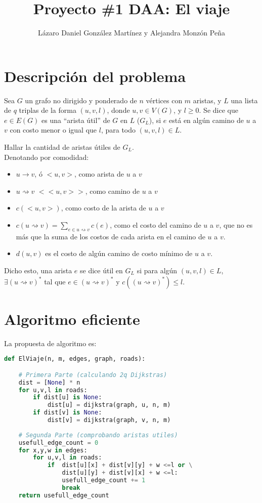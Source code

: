 \documentclass[a4paper]{article}
\begin{document}
    \title{\textbf{Proyecto \#1 DAA:} El viaje}
    \author{L\'azaro Daniel Gonz\'alez Mart\'inez y Alejandra Monz\'on Pe\~na}
    \date{}
    \maketitle

    \section*{Descripci\'on del problema}
    Sea $G$ un grafo no dirigido y ponderado de $n$ vértices con $m$ aristas, y $L$ una lista de $q$ triplas de la forma $(u,v,l)$, donde $u,v\in V(G)$, y $l \ge 0$. Se dice que $e \in E(G)$ es una ``arista útil'' de $G$ en $L$ ($G_L$), si $e$ está en algún camino de $u$ a $v$ con costo menor o igual que $l$, para todo $(u,v,l)\in L$.
    
    Hallar la cantidad de aristas útiles de $G_L$.\\
    
    Denotando por comodidad:
    \begin{itemize}
    	\item $u \rightarrow v$, ó $<u,v>$, como arista de $u$ a $v$
    	\item $u \rightsquigarrow v$ $<<u, v>>$, como camino de $u$ a $v$
    	\item $c(<u,v>)$, como costo de la arista de $u$ a $v$
    	\item $c(u \rightsquigarrow v) = \sum_{e\in u \rightsquigarrow v}^{}c(e)$, como el costo del camino de $u$ a $v$, que no es más que la suma de los costos de cada arista en el camino de $u$ a $v$.
    	\item $d(u,v)$ es el costo de algún camino de costo mínimo de $u$ a $v$.
    \end{itemize}
	
	Dicho esto, una arista $e$ se dice útil en $G_L$ si para algún $(u,v,l) \in L$, $\exists (u\rightsquigarrow v)^*$ tal que $e \in (u\rightsquigarrow v)^*$ y $c((u\rightsquigarrow v)^*) \le l$.
    
    
    \section*{Algoritmo eficiente}
    
    La propuesta de algoritmo es:
    
    \begin{lstlisting}[language=Python]
def ElViaje(n, m, edges, graph, roads):

    # Primera Parte (calculando 2q Dijkstras)
    dist = [None] * n
    for u,v,l in roads:
        if dist[u] is None:
            dist[u] = dijkstra(graph, u, n, m)
        if dist[v] is None:
            dist[v] = dijkstra(graph, v, n, m)
    
    # Segunda Parte (comprobando aristas utiles)
    usefull_edge_count = 0     
    for x,y,w in edges:
        for u,v,l in roads:
            if  dist[u][x] + dist[v][y] + w <=l or \
                dist[u][y] + dist[v][x] + w <=l:
                usefull_edge_count += 1
                break
    return usefull_edge_count
    \end{lstlisting}
    
\end{document}
